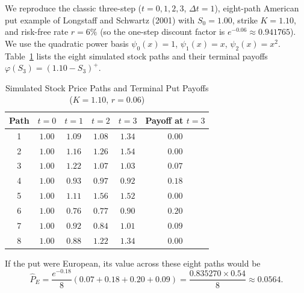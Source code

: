 \begin{example}\label{ex:lsm-walkthrough}
    We reproduce the classic three-step ($t = 0, 1, 2, 3$, $\Delta t = 1$), eight-path American put example of Longstaff and Schwartz (2001) with $S_0 = 1.00$, strike $K = 1.10$, and risk-free rate $r = 6\%$ (so the one-step discount factor is $e^{-0.06} \approx 0.941765$). We use the quadratic power basis $\psi_0(x) = 1$, $\psi_1(x) = x$, $\psi_2(x) = x^2$. Table~\ref{tab:lsm-paths} lists the eight simulated stock paths and their terminal payoffs $\varphi(S_3) = (1.10 - S_3)^+$.

    \begin{table}[!htbp]
        \centering
        \small
        \caption{Simulated Stock Price Paths and Terminal Put Payoffs ($K = 1.10$, $r = 0.06$)}\label{tab:lsm-paths}
        \begin{tabular}{c c c c c c}
            \toprule
            \textbf{Path} & $t = 0$ & $t = 1$ & $t = 2$ & $t = 3$ & \textbf{Payoff at $t = 3$} \\
            \midrule
            1 & $1.00$ & $1.09$ & $1.08$ & $1.34$ & $0.00$ \\
            2 & $1.00$ & $1.16$ & $1.26$ & $1.54$ & $0.00$ \\
            3 & $1.00$ & $1.22$ & $1.07$ & $1.03$ & $0.07$ \\
            4 & $1.00$ & $0.93$ & $0.97$ & $0.92$ & $0.18$ \\
            5 & $1.00$ & $1.11$ & $1.56$ & $1.52$ & $0.00$ \\
            6 & $1.00$ & $0.76$ & $0.77$ & $0.90$ & $0.20$ \\
            7 & $1.00$ & $0.92$ & $0.84$ & $1.01$ & $0.09$ \\
            8 & $1.00$ & $0.88$ & $1.22$ & $1.34$ & $0.00$ \\
            \bottomrule
        \end{tabular}
    \end{table}

    If the put were European, its value across these eight paths would be
    \[
    \hat{P}_E = \frac{e^{-0.18}}{8}(0.07 + 0.18 + 0.20 + 0.09) = \frac{0.835270 \times 0.54}{8} \approx 0.0564.
    \]


\end{example}
